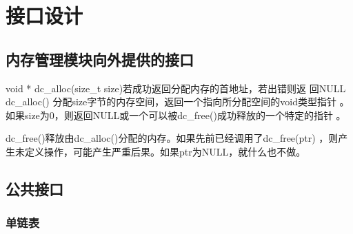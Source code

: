 %
%
\section{接口设计}
\subsection{内存管理模块向外提供的接口}

	{void * dc\_alloc(size\_t size)}{若成功返回分配内存的首地址，若出错则返
	回NULL}
	dc\_alloc() 分配size字节的内存空间，返回一个指向所分配空间的void类型指针
	。如果size为0，则返回NULL或一个可以被dc\_free()成功释放的一个特定的指针
	。

	dc\_free()释放由dc\_alloc()分配的内存。如果先前已经调用了dc\_free(ptr)
	，则产生未定义操作，可能产生严重后果。如果ptr为NULL，就什么也不做。 

\subsection{公共接口}
\subsubsection{单链表}


%
